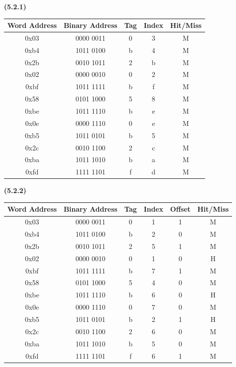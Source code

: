 \documentclass[11pt]{article}
\renewcommand\part[1]{\vspace{.10in}\textbf{(#1)}\par}
\begin{document}
	\part{5.2.1}
		\begin{center}
			\begin{tabular}{|c|c|c|c|c|}
				\hline
				Word Address & Binary Address & Tag & Index & Hit/Miss\\
				\hline
				0x03 & 0000 0011 & 0 & 3 & M\\
				\hline
				0xb4 & 1011 0100 & b & 4 & M\\
				\hline
				0x2b & 0010 1011 & 2 & b & M\\
				\hline
				0x02 & 0000 0010 & 0 & 2 & M\\
				\hline
				0xbf & 1011 1111 & b & f & M\\
				\hline
				0x58 & 0101 1000 & 5 & 8 & M\\
				\hline
				0xbe & 1011 1110 & b & e & M\\
				\hline
				0x0e & 0000 1110 & 0 & e & M\\
				\hline
				0xb5 & 1011 0101 & b & 5 & M\\
				\hline
				0x2c & 0010 1100 & 2 & c & M\\
				\hline
				0xba & 1011 1010 & b & a & M\\
				\hline
				0xfd & 1111 1101 & f & d & M\\
				\hline
			\end{tabular}
		\end{center}
	
	\newpage
	\part{5.2.2}
		\begin{center}
			\begin{tabular}{|c|c|c|c|c|c|}
				\hline
				Word Address & Binary Address & Tag & Index & Offset & Hit/Miss\\
				\hline
				0x03 & 0000 0011 & 0 & 1 & 1 & M\\
				\hline
				0xb4 & 1011 0100 & b & 2 & 0 & M\\
				\hline
				0x2b & 0010 1011 & 2 & 5 & 1 & M\\
				\hline
				0x02 & 0000 0010 & 0 & 1 & 0 & H\\
				\hline
				0xbf & 1011 1111 & b & 7 & 1 & M\\
				\hline
				0x58 & 0101 1000 & 5 & 4 & 0 & M\\
				\hline
				0xbe & 1011 1110 & b & 6 & 0 & H\\
				\hline
				0x0e & 0000 1110 & 0 & 7 & 0 & M\\
				\hline
				0xb5 & 1011 0101 & b & 2 & 1 & H\\
				\hline
				0x2c & 0010 1100 & 2 & 6 & 0 & M\\ 
				\hline
				0xba & 1011 1010 & b & 5 & 0 & M\\
				\hline
				0xfd & 1111 1101 & f & 6 & 1 & M\\
				\hline
			\end{tabular}
		\end{center}
	
\end{document}
